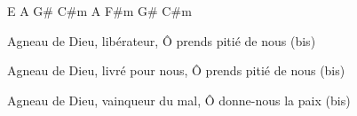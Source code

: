 E A G# C#m A F#m G# C#m

Agneau de Dieu, libérateur, Ô prends pitié de nous (bis)

Agneau de Dieu, livré pour nous, Ô prends pitié de nous (bis)

Agneau de Dieu, vainqueur du mal, Ô donne-nous la paix (bis) 
